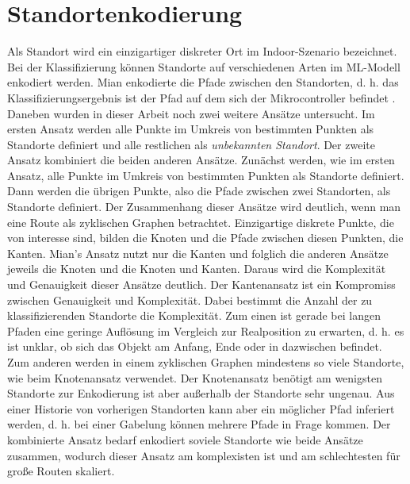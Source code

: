\section{Standortenkodierung}
Als Standort wird ein einzigartiger diskreter Ort im Indoor-Szenario bezeichnet.
Bei der Klassifizierung können Standorte auf verschiedenen Arten im ML-Modell enkodiert werden.
Mian enkodierte die Pfade zwischen den Standorten, d. h. das Klassifizierungsergebnis ist der Pfad auf dem sich der Mikrocontroller befindet \cite{naveedThesis}.
\newline
\newline
Daneben wurden in dieser Arbeit noch zwei weitere Ansätze untersucht.
Im ersten Ansatz werden alle Punkte im Umkreis von bestimmten Punkten als Standorte definiert und alle restlichen als \textit{unbekannten Standort}.
Der zweite Ansatz kombiniert die beiden anderen Ansätze.
Zunächst werden, wie im ersten Ansatz, alle Punkte im Umkreis von bestimmten Punkten als Standorte definiert.
Dann werden die übrigen Punkte, also die Pfade zwischen zwei Standorten, als Standorte definiert.
\newline
\newline
Der Zusammenhang dieser Ansätze wird deutlich, wenn man eine Route als zyklischen Graphen betrachtet.
Einzigartige diskrete Punkte, die von interesse sind, bilden die Knoten und die Pfade zwischen diesen Punkten, die Kanten.
Mian's Ansatz nutzt nur die Kanten und folglich die anderen Ansätze jeweils die Knoten und die Knoten und Kanten.
\newline
\newline
Daraus wird die Komplexität und Genauigkeit dieser Ansätze deutlich.
Der Kantenansatz ist ein Kompromiss zwischen Genauigkeit und Komplexität.
Dabei bestimmt die Anzahl der zu klassifizierenden Standorte die Komplexität.
Zum einen ist gerade bei langen Pfaden eine geringe Auflösung im Vergleich zur Realposition zu erwarten,
d. h. es ist unklar, ob sich das Objekt am Anfang, Ende oder in dazwischen befindet.
Zum anderen werden in einem zyklischen Graphen mindestens so viele Standorte, wie beim Knotenansatz verwendet.
Der Knotenansatz benötigt am wenigsten Standorte zur Enkodierung ist aber außerhalb der Standorte sehr ungenau.
Aus einer Historie von vorherigen Standorten kann aber ein möglicher Pfad inferiert werden,
d. h. bei einer Gabelung können mehrere Pfade in Frage kommen.
Der kombinierte Ansatz bedarf enkodiert soviele Standorte wie beide Ansätze zusammen,
wodurch dieser Ansatz am komplexisten ist und am schlechtesten für große Routen skaliert.
